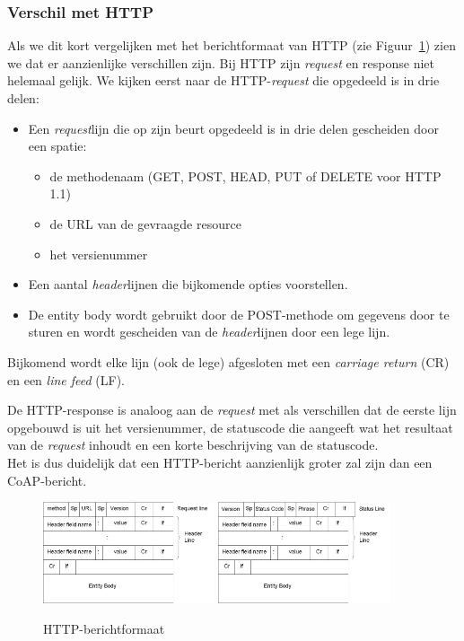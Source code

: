\newpage

\subsubsection{Verschil met HTTP}

Als we dit kort vergelijken met het berichtformaat van HTTP (zie Figuur~\ref{fig:HTTPMessageFormat}) zien we dat er aanzienlijke verschillen zijn. Bij HTTP zijn \textit{request} en response niet helemaal gelijk. We kijken eerst naar de HTTP-\textit{request} die opgedeeld is in drie delen:
\begin{itemize}
\item Een \textit{request}lijn die op zijn beurt opgedeeld is in drie delen gescheiden door een spatie:
\begin{itemize}
\item de methodenaam (GET, POST, HEAD, PUT of DELETE voor HTTP 1.1)
\item de URL van de gevraagde resource
\item het versienummer
\end{itemize}
\item Een aantal \textit{header}lijnen die bijkomende opties voorstellen.
\item De entity body wordt gebruikt door de POST-methode om gegevens door te sturen en wordt gescheiden van de \textit{header}lijnen door een lege lijn. 
\end{itemize}
Bijkomend wordt elke lijn (ook de lege) afgesloten met een \textit{carriage return} (CR) en een \textit{line feed} (LF).

De HTTP-response is analoog aan de \textit{request} met als verschillen dat de eerste lijn opgebouwd is uit het versienummer, de statuscode die aangeeft wat het resultaat van de \textit{request} inhoudt en een korte beschrijving van de statuscode.\\
Het is dus duidelijk dat een HTTP-bericht aanzienlijk groter zal zijn dan een CoAP-bericht.

\begin{figure}[h]
\vspace{10pt}
\centering
{}
{\includegraphics[width=0.45\textwidth]{fig/HTTPRequestMessageFormat}}
{\includegraphics[width=0.45\textwidth]{fig/HTTPResponseMessageFormat}}
\caption{HTTP-berichtformaat}
\label{fig:HTTPMessageFormat}
\end{figure}

